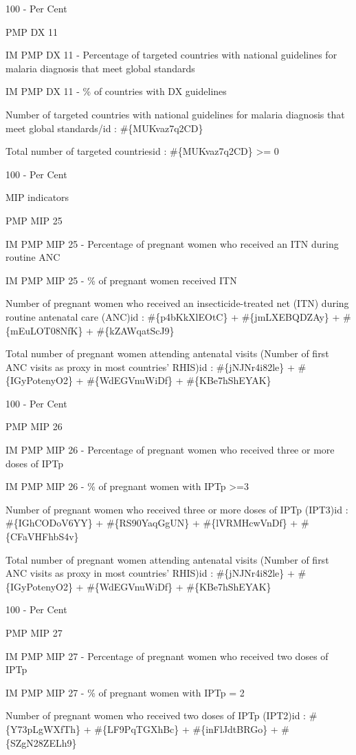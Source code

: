 \documentclass[]{book}
\begin{document}
100 - Per Cent

PMP DX 11

IM PMP DX 11 - Percentage of targeted countries with national guidelines for malaria diagnosis that meet global standards

IM PMP DX 11 - \% of countries with DX guidelines

Number of targeted countries with national guidelines for malaria diagnosis that meet global standards/id : \#\{MUKvaz7q2CD\}

Total number of targeted countriesid : \#\{MUKvaz7q2CD\} \textgreater{}= 0

100 - Per Cent

MIP indicators

PMP MIP 25

IM PMP MIP 25 - Percentage of pregnant women who received an ITN during routine ANC

IM PMP MIP 25 - \% of pregnant women received ITN

Number of pregnant women who received an insecticide-treated net (ITN) during routine antenatal care (ANC)id : \#\{p4bKkXlEOtC\} + \#\{jmLXEBQDZAy\} + \#\{mEuLOT08NfK\} + \#\{kZAWqatScJ9\}

Total number of pregnant women attending antenatal visits (Number of first ANC visits as proxy in most countries' RHIS)id : \#\{jNJNr4i82le\} + \#\{IGyPotenyO2\} + \#\{WdEGVnuWiDf\} + \#\{KBe7hShEYAK\}

100 - Per Cent

PMP MIP 26

IM PMP MIP 26 - Percentage of pregnant women who received three or more doses of IPTp

IM PMP MIP 26 - \% of pregnant women with IPTp \textgreater{}=3

Number of pregnant women who received three or more doses of IPTp (IPT3)id : \#\{IGhCODoV6YY\} + \#\{RS90YaqGgUN\} + \#\{lVRMHcwVnDf\} + \#\{CFaVHFhbS4v\}

Total number of pregnant women attending antenatal visits (Number of first ANC visits as proxy in most countries' RHIS)id : \#\{jNJNr4i82le\} + \#\{IGyPotenyO2\} + \#\{WdEGVnuWiDf\} + \#\{KBe7hShEYAK\}

100 - Per Cent

PMP MIP 27

IM PMP MIP 27 - Percentage of pregnant women who received two doses of IPTp

IM PMP MIP 27 - \% of pregnant women with IPTp = 2

Number of pregnant women who received two doses of IPTp (IPT2)id : \#\{Y73pLgWXfTh\} + \#\{LF9PqTGXhBc\} + \#\{inFlJdtBRGo\} + \#\{SZgN28ZELh9\}
\end{document}
